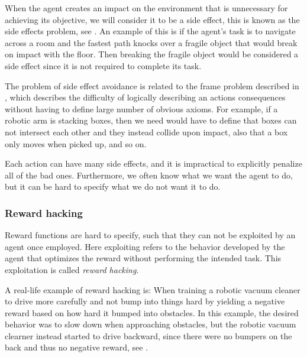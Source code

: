 \documentclass[12pt,A4]{report}
\theoremstyle{definition}
\begin{document}
When the agent creates an impact on the environment that is unnecessary for achieving its objective, we will consider it to be a side effect, this is known as the side effects problem, see \citet{Amodei}. An example of this is if the agent's task is to navigate across a room and the fastest path knocks over a fragile object that would break on impact with the floor. Then breaking the fragile object would be considered a side effect since it is not required to complete its task. 

The problem of side effect avoidance is related to the frame problem described in \citet{Mc69}, which describes the difficulty of logically describing an actions consequences without having to define large number of obvious axioms. For example, if a robotic arm is stacking boxes, then we need would have to define that boxes can not intersect each other and they instead collide upon impact, also that a box only moves when picked up, and so on.

Each action can have many side effects, and it is impractical to explicitly penalize all of the bad ones. Furthermore, we often know what we want the agent to do, but it can be hard to specify what we do not want it to do. 


\subsubsection{Reward hacking}
Reward functions are hard to specify, such that they can not be exploited by an agent once employed. Here exploiting refers to the behavior developed by the agent that optimizes the reward without performing the intended task. This exploitation is called \textit{reward hacking}. 

A real-life example of reward hacking is: When training a robotic vacuum cleaner to drive more carefully and not bump into things hard by yielding a negative reward based on how hard it bumped into obstacles. In this example, the desired behavior was to slow down when approaching obstacles, but the robotic vacuum clearner instead started to drive backward, since there were no bumpers on the back and thus no negative reward, see \citet{Smingleigh}. 
\end{document}
